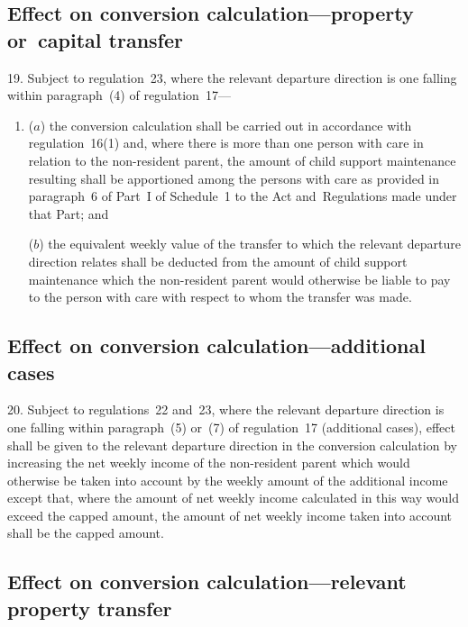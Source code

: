 \documentclass[12pt,a4paper]{article}
\begin{document}
\subsection[19. Effect on conversion calculation—property or~capital transfer]{Effect on conversion calculation—property or~capital transfer}

19.  Subject to regulation~23, where the relevant departure direction is one falling within paragraph~(4) of regulation~17—
\begin{enumerate}\item[]
($a$) the conversion calculation shall be carried out in accordance with regulation~16(1) and, where there is more than one person with care in relation to the non-resident parent, the amount of child support maintenance resulting shall be apportioned among the persons with care as provided in paragraph~6 of Part~I of Schedule~1 to the Act and~Regulations made under that Part; and

($b$) the equivalent weekly value of the transfer to which the relevant departure direction relates shall be deducted from the amount of child support maintenance which the non-resident parent would otherwise be liable to pay to the person with care with respect to whom the transfer was made.
\end{enumerate}

\subsection[20. Effect on conversion calculation—additional cases]{Effect on conversion calculation—additional cases}

20.  Subject to regulations~22 and~23, where the relevant departure direction is one falling within paragraph~(5) or~(7) of regulation~17 (additional cases), effect shall be given to the relevant departure direction in the conversion calculation by increasing the net weekly income of the non-resident parent which would otherwise be taken into account by the weekly amount of the additional income except that, where the amount of net weekly income calculated in this way would exceed the capped amount, the amount of net weekly income taken into account shall be the capped amount.

{
\subsection[21. Effect on conversion calculation—relevant property transfer]{\sloppy Effect on conversion calculation—relevant property transfer}

}
\end{document}
